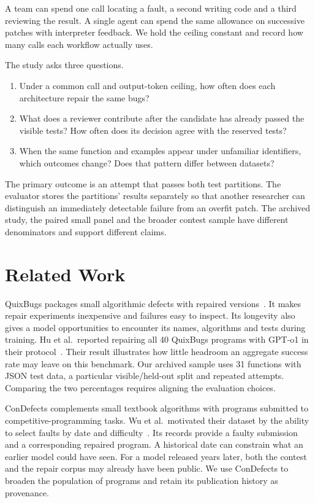 \documentclass[conference]{IEEEtran}
\begin{document}
A team can spend one call locating a fault, a second writing code and a third reviewing the result. A single agent can spend the same allowance on successive patches with interpreter feedback. We hold the ceiling constant and record how many calls each workflow actually uses.

The study asks three questions.
\begin{enumerate}
\item Under a common call and output-token ceiling, how often does each architecture repair the same bugs?
\item What does a reviewer contribute after the candidate has already passed the visible tests? How often does its decision agree with the reserved tests?
\item When the same function and examples appear under unfamiliar identifiers, which outcomes change? Does that pattern differ between datasets?
\end{enumerate}
The primary outcome is an attempt that passes both test partitions. The evaluator stores the partitions' results separately so that another researcher can distinguish an immediately detectable failure from an overfit patch. The archived study, the paired small panel and the broader contest sample have different denominators and support different claims.

\section{Related Work}
QuixBugs packages small algorithmic defects with repaired versions~\cite{quix}. It makes repair experiments inexpensive and failures easy to inspect. Its longevity also gives a model opportunities to encounter its names, algorithms and tests during training. Hu et al.\ reported repairing all 40 QuixBugs programs with GPT-o1 in their protocol~\cite{hu}. Their result illustrates how little headroom an aggregate success rate may leave on this benchmark. Our archived sample uses 31 functions with JSON test data, a particular visible/held-out split and repeated attempts. Comparing the two percentages requires aligning the evaluation choices.

ConDefects complements small textbook algorithms with programs submitted to competitive-programming tasks. Wu et al.\ motivated their dataset by the ability to select faults by date and difficulty~\cite{wu}. Its records provide a faulty submission and a corresponding repaired program. A historical date can constrain what an earlier model could have seen. For a model released years later, both the contest and the repair corpus may already have been public. We use ConDefects to broaden the population of programs and retain its publication history as provenance.
\end{document}
